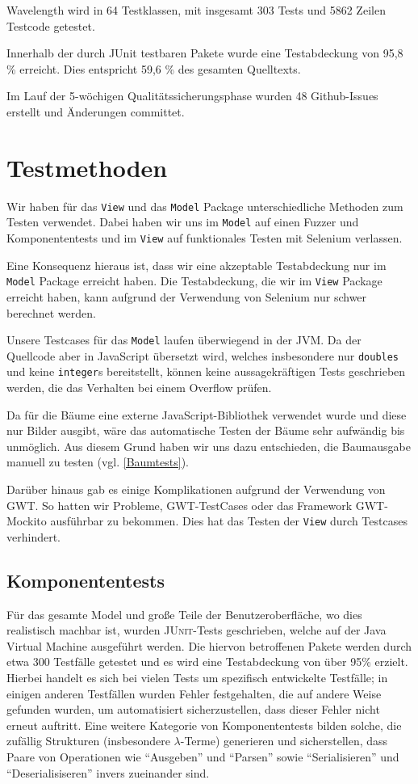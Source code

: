 \documentclass[parskip=full,11pt,openany]{scrreprt}
\begin{document}
Wavelength wird in 64 Testklassen, mit insgesamt 303 Tests
und 5862 Zeilen Testcode getestet.

Innerhalb der durch JUnit testbaren Pakete wurde eine 
Testabdeckung von 95,8 \% erreicht. Dies entspricht 59,6 \%
des gesamten Quelltexts.

Im Lauf der 5-wöchigen Qualitätssicherungsphase wurden
48 Github-Issues erstellt und  Änderungen committet.


\chapter{Testmethoden}
Wir haben für das \texttt{View} und das \texttt{Model} Package unterschiedliche
Methoden zum Testen verwendet. Dabei haben wir uns im \texttt{Model} auf einen
Fuzzer und Komponententests und im \texttt{View} auf funktionales Testen mit
Selenium verlassen.

Eine Konsequenz hieraus ist, dass wir eine akzeptable Testabdeckung nur im
\texttt{Model} Package erreicht haben. Die Testabdeckung, die wir im
\texttt{View} Package erreicht haben, kann aufgrund der Verwendung von Selenium
nur schwer berechnet werden.

Unsere Testcases für das \texttt{Model} laufen überwiegend in der JVM. Da der
Quellcode aber in JavaScript übersetzt wird, welches insbesondere nur
\texttt{doubles} und keine \texttt{integer}s bereitstellt, können keine
aussagekräftigen Tests geschrieben werden, die das Verhalten bei einem Overflow
prüfen.

Da für die Bäume eine externe JavaScript-Bibliothek verwendet wurde und diese
nur Bilder ausgibt, wäre das automatische Testen der Bäume sehr aufwändig bis
unmöglich. Aus diesem Grund haben wir uns dazu entschieden, die Baumausgabe
manuell zu testen (vgl. \ref{Baumtests}).

Darüber hinaus gab es einige Komplikationen aufgrund der Verwendung von GWT.
So hatten wir Probleme, GWT-TestCases oder das Framework GWT-Mockito ausführbar
zu bekommen. Dies hat das Testen der \texttt{View} durch Testcases verhindert.

\section{Komponententests}
Für das gesamte Model und große Teile der Benutzeroberfläche, wo dies realistisch
machbar ist, wurden \textsc{JUnit}-Tests geschrieben, welche auf der Java Virtual
Machine ausgeführt werden. Die hiervon betroffenen Pakete werden durch etwa 300
Testfälle getestet und es wird eine Testabdeckung von über 95\% erzielt. Hierbei
handelt es sich bei vielen Tests um spezifisch entwickelte Testfälle; in einigen
anderen Testfällen wurden Fehler festgehalten, die auf andere Weise gefunden
wurden, um automatisiert sicherzustellen, dass dieser Fehler nicht erneut
auftritt. Eine weitere Kategorie von Komponententests bilden solche, die zufällig Strukturen
(insbesondere $\lambda$-Terme) generieren und sicherstellen, dass Paare von
Operationen wie \enquote{Ausgeben} und \enquote{Parsen} sowie \enquote{Serialisieren}
und \enquote{Deserialisiseren} invers zueinander sind.
\end{document}
